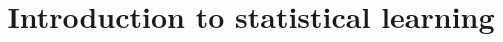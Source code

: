 





\title{Introduction to statistical learning}
\date{}

\maketitle
\frontmatter

\dominitoc

\tableofcontents

\mainmatter
%
%

%
%




%

%




\thispagestyle{empty}

\printindex

